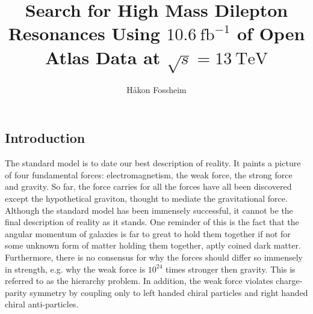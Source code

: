 \documentclass{article}
\begin{document}
{\setlength\doublerulesep{5pt}}   %

\begin{titlepage}

\title{Search for High Mass Dilepton Resonances Using $\SI{10.6}{\femto\barn}^{-1}$ of Open Atlas Data at $\sqrt{s} = \SI{13}{\tera \eV}$ }
\author{Håkon Fossheim}
\date{\href{https://github.com/fosheimdet/FYS5555/tree/master/Project3}{}}
\maketitle


\newcommand{\HRule}{\rule{\linewidth}{0.5mm}} %


    
    


\section{Introduction}

The standard model is to date our best description of reality. It paints a picture of four fundamental forces: electromagnetism, the weak force, the strong force and gravity. So far, the force carries for all the forces have all been discovered except the hypothetical graviton, thought to mediate the gravitational force. 
Although the standard model has been immensely successful, it cannot be the final description of reality as it stands. One reminder of this is the fact that the angular momentum of galaxies is far to great to hold them together if not for some unknown form of matter holding them together, aptly coined dark matter. Furthermore, there is no consensus for why the forces should differ so immensely in strength, e.g. why the weak force is $10^{24}$ times stronger then gravity. This is referred to as the hierarchy problem. In addition, the weak force violates charge-parity symmetry by coupling only to left handed chiral particles and right handed chiral anti-particles.  


\end{titlepage}
\end{document}
